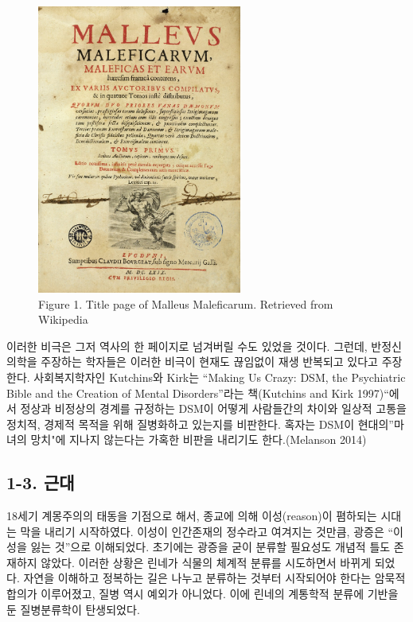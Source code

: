 \documentclass[
]{article}
\begin{document}
\begin{figure}
\hypertarget{fig:malleus}{%
\centering
\includegraphics[width=0.6\textwidth,height=\textheight]{images/01-01/img_0.png}
\caption{Figure 1. Title page of Malleus Maleficarum. Retrieved from
Wikipedia}\label{fig:malleus}
}
\end{figure}

이러한 비극은 그저 역사의 한 페이지로 넘겨버릴 수도 있었을 것이다.
그런데, 반정신의학을 주장하는 학자들은 이러한 비극이 현재도 끊임없이
재생 반복되고 있다고 주장한다. 사회복지학자인 Kutchins와 Kirk는 ``Making
Us Crazy: DSM, the Psychiatric Bible and the Creation of Mental
Disorders''라는 책(Kutchins and Kirk 1997)``에서 정상과 비정상의 경계를
규정하는 DSM이 어떻게 사람들간의 차이와 일상적 고통을 정치적, 경제적
목적을 위해 질병화하고 있는지를 비판한다. 혹자는 DSM이 현대의''마녀의
망치"에 지나지 않는다는 가혹한 비판을 내리기도 한다.(Melanson 2014)

\hypertarget{modern-period}{%
\subsection{1-3. 근대}\label{modern-period}}

18세기 계몽주의의 태동을 기점으로 해서, 종교에 의해 이성(reason)이
폄하되는 시대는 막을 내리기 시작하였다. 이성이 인간존재의 정수라고
여겨지는 것만큼, 광증은 ``이성을 잃는 것''으로 이해되었다. 초기에는
광증을 굳이 분류할 필요성도 개념적 틀도 존재하지 않았다. 이러한 상황은
린네가 식물의 체계적 분류를 시도하면서 바뀌게 되었다. 자연을 이해하고
정복하는 길은 나누고 분류하는 것부터 시작되어야 한다는 암묵적 합의가
이루어졌고, 질병 역시 예외가 아니었다. 이에 린네의 계통학적 분류에
기반을 둔 질병분류학이 탄생되었다.
\end{document}

